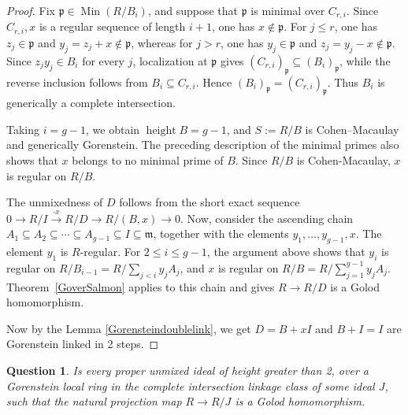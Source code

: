 \documentclass[11pt,letterpaper]{amsart}
\newcommand{\x}{\xrightarrow{}}
\DeclareMathOperator{\Min}{Min}
\DeclareMathOperator{\height}{height}
\theoremstyle{plain}
\newtheorem{cor}[thm]{Corollary}
\newtheorem{question}[thm]{Question}
\theoremstyle{definition}
\theoremstyle{remark}
\begin{document}
\begin{proof}
Fix \(\mathfrak p\in\Min(R/B_i)\), and suppose that \(\mathfrak p\) is minimal over \(C_{r,i}\). Since \(C_{r,i},x\) is a regular sequence of length \(i+1\), one has \(x\notin\mathfrak p\). For \(j\leq r\), one has \(z_j\in\mathfrak p\) and \(y_j=z_j+x\notin\mathfrak p\), whereas for \(j>r\), one has \(y_j\in\mathfrak p\) and \(z_j=y_j-x\notin\mathfrak p\). Since \(z_jy_j\in B_i\) for every \(j\), localization at \(\mathfrak p\) gives \((C_{r,i})_\mathfrak p\subseteq (B_i)_\mathfrak{p}\), while the reverse inclusion follows from \(B_i\subseteq C_{r,i}\). Hence \((B_i)_\mathfrak p=(C_{r,i})_\mathfrak p\). Thus \(B_i\) is generically a complete intersection.


Taking \(i=g-1\), we obtain \(\height B=g-1\), and \(S:=R/B\) is Cohen--Macaulay and generically Gorenstein. The preceding description of the minimal primes also shows that \(x\) belongs to no minimal prime of \(B\). Since \(R/B\) is Cohen-Macaulay, \(x\) is regular on \(R/B\).

The unmixedness of $D$ follows from the short exact sequence
$0\x R/I\xrightarrow{\cdot x}R/D\x R/(B,x)\x0$. Now, consider the ascending chain \(A_1\subseteq A_2\subseteq\cdots\subseteq A_{g-1}\subseteq I\subseteq \mathfrak m\), together with the elements \(y_1,\ldots,y_{g-1},x\). The element \(y_1\) is \(R\)-regular. For \(2\leq i\leq g-1\), the argument above shows that \(y_i\) is regular on \(R/B_{i-1}=R/\sum_{j<i}y_jA_j\), and \(x\) is regular on \(R/B=R/\sum_{j=1}^{g-1}y_jA_j\). 
Theorem~\ref{GoverSalmon} applies to this chain and gives \(R\to R/D\) is a Golod homomorphism.

Now by the Lemma \ref{Gorensteindoublelink}, we get $D=B+xI$ and $B+I=I$ are Gorenstein linked in 2 steps. 
\end{proof}


\begin{question}\label{questiongolod}
    Is every proper unmixed ideal of height greater than 2, over a Gorenstein local ring in the complete intersection linkage class of some ideal $J$, such that the natural projection map $R\x R/J$ is a Golod homomorphism.
\end{question}
 
\end{document}
